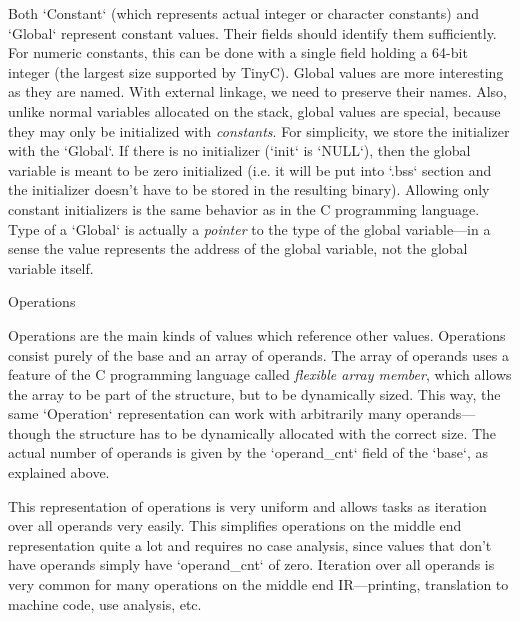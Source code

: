 Both `Constant` (which represents actual integer or character constants) and
`Global` represent constant values. Their fields should identify
them sufficiently. For numeric constants, this can be done with a single field
holding a 64-bit integer (the largest size supported by TinyC). Global values
are more interesting as they are named. With external linkage, we need to
preserve their names. Also, unlike normal variables allocated on the stack,
global values are special, because they may only be initialized with {\em
constants}. For simplicity, we store the initializer with the `Global`. If there
is no initializer (`init` is `NULL`), then the global variable is meant to be
zero initialized (i.e. it will be put into `.bss` section and the initializer
doesn't have to be stored in the resulting binary). Allowing only constant
initializers is the same behavior as in the C programming language.
Type of a `Global` is actually a {\em pointer} to the type of the global
variable---in a sense the value represents the address of the global variable,
not the global variable itself.

\seccc Operations

Operations are the main kinds of values which reference other values. Operations
consist
purely of the base and an array of operands. The array of operands uses a
feature of the C programming language called {\em flexible array member}, which
allows the array to be part of the structure, but to be dynamically sized. This
way, the same `Operation` representation can work with arbitrarily many
operands---though the structure has to be dynamically allocated with the correct
size. The actual number of operands is given by the `operand_cnt` field of the
`base`, as explained above.

This representation of operations is very uniform and allows tasks as iteration
over all operands very easily. This simplifies operations on the middle end
representation quite a lot and requires no case analysis, since values that
don't have operands simply have `operand_cnt` of zero. Iteration over all operands is
very common for many operations on the middle end IR---printing, translation to
machine code, use analysis, etc.

